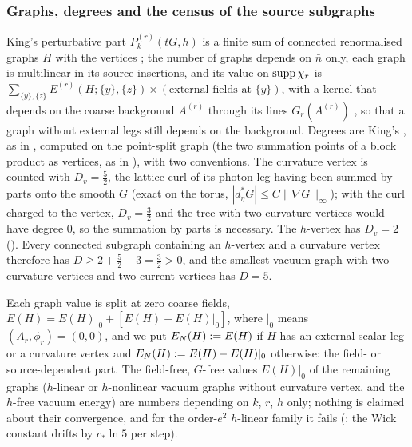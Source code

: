 
\subsubsection*{Graphs, degrees and the census of the source subgraphs}

King's perturbative part $P^{(r)}_k(tG,h)$ is a finite sum of connected renormalised graphs $H$ \cite[(3.29), (3.37)]{K1} with the vertices \cite[(3.18)--(3.26)]{K1}; the number of graphs depends on $\bar n$ only, each graph is multilinear in its source insertions, and its value on $\operatorname{supp}\chi_r$ is $\sum_{\{y\},\{z\}}E^{(r)}(H;\{y\},\{z\})\times(\text{external fields at }\{y\})$, with a kernel that depends on the coarse background $A^{(r)}$ through its lines $G_r(A^{(r)})$ \cite[(3.17)]{K1}, so that a graph without external legs still depends on the background. Degrees are King's \cite[(3.30)--(3.31)]{K1}, as in , computed on the point-split graph (the two summation points of a block product as vertices, as in ), with two conventions. The curvature vertex \cite[(3.20)]{K1} is counted with $D_v=\frac52$, the lattice curl of its photon leg having been summed by parts onto the smooth $G$ (exact on the torus, $|d^*_\eta G|\le C\|\nabla G\|_\infty$); with the curl charged to the vertex, $D_v=\frac32$ and the tree with two curvature vertices would have degree $0$, so the summation by parts is necessary. The $h$-vertex \cite[(3.21)]{K1} has $D_v=2$ (). Every connected subgraph containing an $h$-vertex and a curvature vertex therefore has $D\ge2+\frac52-3=\frac32>0$, and the smallest vacuum graph with two curvature vertices and two current vertices has $D=5$.

Each graph value is split at zero coarse fields, $E(H)=E(H)|_0+[E(H)-E(H)|_0]$, where $|_0$ means $(A_r,\phi_r)=(0,0)$, and we put $E_N(H):= E(H)$ if $H$ has an external scalar leg or a curvature vertex and $E_N(H):= E(H)-E(H)|_0$ otherwise: the field- or source-dependent part. The field-free, $G$-free values $E(H)|_0$ of the remaining graphs ($h$-linear or $h$-nonlinear vacuum graphs without curvature vertex, and the $h$-free vacuum energy) are numbers depending on $k$, $r$, $h$ only; nothing is claimed about their convergence, and for the order-$e^2$ $h$-linear family it fails (: the Wick constant drifts by $c_*\ln5$ per step).

